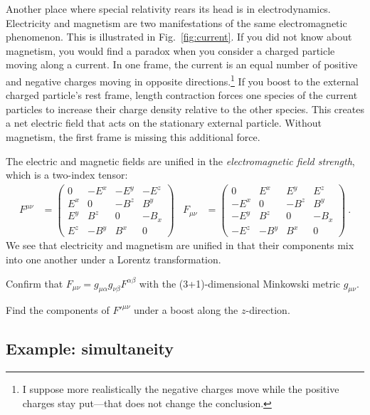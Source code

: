 \documentclass[12pt, oneside]{report}    %
\begin{document}
\begin{subappendices}
Another place where special relativity rears its head is in electrodynamics. Electricity and magnetism are two manifestations of the same electromagnetic phenomenon. This is illustrated in Fig.~\ref{fig:current}. If you did not know about magnetism, you would find a paradox when you consider a charged particle moving along a current. In one frame, the current is an equal number of positive and negative charges moving in opposite directions.\footnote{I suppose more realistically the negative charges move while the positive charges stay put---that does not change the conclusion.} If you boost to the external charged particle's rest frame, length contraction forces one species of the current particles to increase their charge density relative to the other species. This creates a net electric field that acts on the stationary external particle. Without magnetism, the first frame is missing this additional force. 

The electric and magnetic fields are unified in the \emph{electromagnetic field strength}, which is a two-index tensor:
\begin{align}
    F^{\mu\nu}
    &=
    \begin{pmatrix}
        0&-E^x&-E^y&-E^z\\
        E^x&0&-B^z&B^y\\
        E^y&B^z&0&-B_x\\
        E^z&-B^y&B^x&0
    \end{pmatrix} %
    &
    F_{\mu\nu}
    &=
    \begin{pmatrix}
        0&E^x&E^y&E^z\\
        -E^x&0&-B^z&B^y\\
        -E^y&B^z&0&-B_x\\
        -E^z&-B^y&B^x&0
    \end{pmatrix} \ .
\end{align}
We see that electricity and magnetism are unified in that their components mix into one another under a Lorentz transformation. 
\begin{exercise}
Confirm that $F_{\mu\nu} =g_{\mu \alpha}g_{\nu\beta} F^{\alpha\beta}$ with the (3+1)-dimensional Minkowski metric $g_{\mu\nu}$. 
\end{exercise}
\begin{exercise}
Find the components of $F'^{\mu\nu}$ under a boost along the $z$-direction. 
\end{exercise}


\subsection{Example: simultaneity}
\label{eq:simultaneity}


\end{subappendices}
\end{document}
